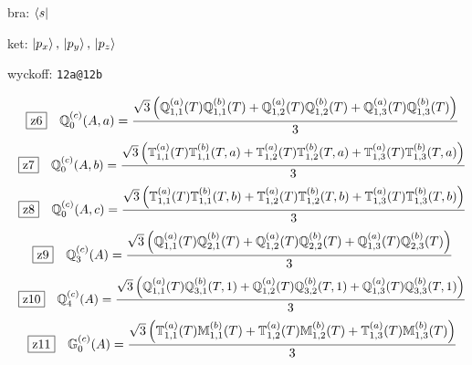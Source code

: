 \documentclass[fleqn,10pt,landscape]{jsarticle}
\begin{document}
\noindent\quad * bra: $\bra{s}$

\noindent\quad * ket: $\ket{p_{x}},\, \ket{p_{y}},\, \ket{p_{z}}$

\noindent\quad * wyckoff: \texttt{12a@12b}

\begin{dmath*}
\hspace*{3mm}\fbox{z6}\quad \mathbb{Q}_{0}^{(c)}(A,a)=\frac{\sqrt{3} \left(\mathbb{Q}_{1,1}^{(a)}(T) \mathbb{Q}_{1,1}^{(b)}(T) + \mathbb{Q}_{1,2}^{(a)}(T) \mathbb{Q}_{1,2}^{(b)}(T) + \mathbb{Q}_{1,3}^{(a)}(T) \mathbb{Q}_{1,3}^{(b)}(T)\right)}{3}
\end{dmath*}
\begin{dmath*}
\hspace*{3mm}\fbox{z7}\quad \mathbb{Q}_{0}^{(c)}(A,b)=\frac{\sqrt{3} \left(\mathbb{T}_{1,1}^{(a)}(T) \mathbb{T}_{1,1}^{(b)}(T,a) + \mathbb{T}_{1,2}^{(a)}(T) \mathbb{T}_{1,2}^{(b)}(T,a) + \mathbb{T}_{1,3}^{(a)}(T) \mathbb{T}_{1,3}^{(b)}(T,a)\right)}{3}
\end{dmath*}
\begin{dmath*}
\hspace*{3mm}\fbox{z8}\quad \mathbb{Q}_{0}^{(c)}(A,c)=\frac{\sqrt{3} \left(\mathbb{T}_{1,1}^{(a)}(T) \mathbb{T}_{1,1}^{(b)}(T,b) + \mathbb{T}_{1,2}^{(a)}(T) \mathbb{T}_{1,2}^{(b)}(T,b) + \mathbb{T}_{1,3}^{(a)}(T) \mathbb{T}_{1,3}^{(b)}(T,b)\right)}{3}
\end{dmath*}
\begin{dmath*}
\hspace*{3mm}\fbox{z9}\quad \mathbb{Q}_{3}^{(c)}(A)=\frac{\sqrt{3} \left(\mathbb{Q}_{1,1}^{(a)}(T) \mathbb{Q}_{2,1}^{(b)}(T) + \mathbb{Q}_{1,2}^{(a)}(T) \mathbb{Q}_{2,2}^{(b)}(T) + \mathbb{Q}_{1,3}^{(a)}(T) \mathbb{Q}_{2,3}^{(b)}(T)\right)}{3}
\end{dmath*}
\begin{dmath*}
\hspace*{3mm}\fbox{z10}\quad \mathbb{Q}_{4}^{(c)}(A)=\frac{\sqrt{3} \left(\mathbb{Q}_{1,1}^{(a)}(T) \mathbb{Q}_{3,1}^{(b)}(T,1) + \mathbb{Q}_{1,2}^{(a)}(T) \mathbb{Q}_{3,2}^{(b)}(T,1) + \mathbb{Q}_{1,3}^{(a)}(T) \mathbb{Q}_{3,3}^{(b)}(T,1)\right)}{3}
\end{dmath*}
\begin{dmath*}
\hspace*{3mm}\fbox{z11}\quad \mathbb{G}_{0}^{(c)}(A)=\frac{\sqrt{3} \left(\mathbb{T}_{1,1}^{(a)}(T) \mathbb{M}_{1,1}^{(b)}(T) + \mathbb{T}_{1,2}^{(a)}(T) \mathbb{M}_{1,2}^{(b)}(T) + \mathbb{T}_{1,3}^{(a)}(T) \mathbb{M}_{1,3}^{(b)}(T)\right)}{3}
\end{dmath*}
\vspace{5mm}
\end{document}
